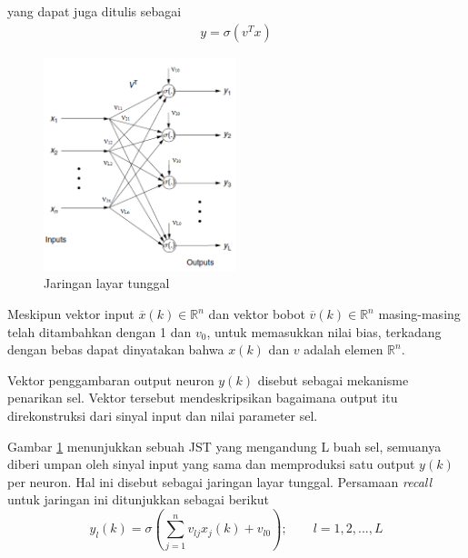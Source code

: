yang dapat juga ditulis sebagai
\vspace{-2em}
\begin{equation} \label{eq:3:matriksfinal}
\begin{split}
y = \sigma(v^Tx)
\end{split}
\end{equation}

\begin{figure}[!h]
	\centering
	\includegraphics[width=0.5\textwidth]{figures/jstTunggal}
	\caption{Jaringan layar tunggal \cite{NNControlBook}}
	\label{fig:3:jstTunggal}
\end{figure}
Meskipun vektor input $\overline{x}(k) \in \mathbb{R}^n $ dan vektor bobot $\overline{v}(k) \in \mathbb{R}^n $ masing-masing telah ditambahkan dengan 1 dan $v_0$, untuk memasukkan nilai bias, terkadang dengan bebas dapat dinyatakan bahwa $x(k)$ dan $v$ adalah elemen $\mathbb{R}^n$.

Vektor penggambaran output neuron $y(k)$ disebut sebagai mekanisme penarikan sel. Vektor tersebut mendeskripsikan bagaimana output itu direkonstruksi dari sinyal input dan nilai parameter sel.

Gambar \ref{fig:3:jstTunggal} menunjukkan sebuah JST yang mengandung L buah sel, semuanya diberi umpan oleh sinyal input yang sama dan memproduksi satu output $y(k)$ per neuron. Hal ini disebut sebagai jaringan layar tunggal. Persamaan \textit{recall} untuk jaringan ini ditunjukkan sebagai berikut
\vspace{0em}
\begin{equation} \label{eq:3:recall}
y_l(k) = \sigma \left( \sum_{j=1}^{n}v_{lj}x_j(k)+v_{l0} \right); \qquad l = 1,2,...,L
\end{equation}


